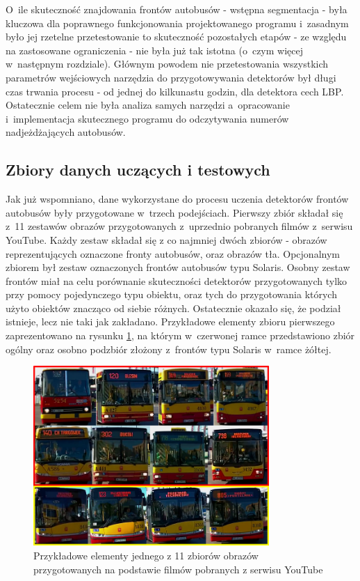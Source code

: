 O~ile skuteczność znajdowania frontów autobusów - wstępna segmentacja - 
była kluczowa dla poprawnego funkcjonowania projektowanego programu 
i~zasadnym było jej rzetelne przetestowanie to skuteczność pozostałych
etapów - ze względu na zastosowane ograniczenia - nie była już tak
istotna (o~czym więcej w~następnym rozdziale). Głównym powodem nie przetestowania wszystkich parametrów
wejściowych narzędzia do przygotowywania detektorów był długi czas 
trwania procesu
- od jednej do kilkunastu godzin, dla detektora cech LBP. Ostatecznie
celem nie była analiza samych narzędzi a~opracowanie i~implementacja
skutecznego programu do odczytywania numerów nadjeżdżających autobusów.

\subsection{Zbiory danych uczących i testowych}

Jak już wspomniano, dane wykorzystane do procesu uczenia detektorów frontów autobusów były przygotowane w~trzech podejściach.
Pierwszy zbiór składał się z~11 zestawów obrazów
przygotowanych z~uprzednio pobranych filmów z~serwisu YouTube.
Każdy zestaw składał się z co najmniej dwóch zbiorów - obrazów 
reprezentujących oznaczone fronty autobusów, oraz obrazów tła. 
Opcjonalnym zbiorem był zestaw oznaczonych 
frontów autobusów typu Solaris. Osobny zestaw frontów miał na celu
porównanie skuteczności detektorów przygotowanych tylko przy pomocy
pojedynczego typu obiektu, oraz tych do przygotowania których użyto
obiektów znacząco od siebie różnych. Ostatecznie okazało się,
że podział istnieje, lecz nie taki jak zakładano. Przykładowe
elementy zbioru pierwszego zaprezentowano na rysunku \ref{fig:jJ9ixBfVR5k_types}, na którym w~czerwonej ramce
przedstawiono zbiór ogólny oraz osobno podzbiór złożony z~frontów typu
Solaris w~ramce żółtej.

\begin{figure}[!h]
	\centering
	\includegraphics[width=0.8\textwidth]{img/exp_trainig_data_jJ9}
	\caption{Przykładowe elementy jednego z 11 zbiorów obrazów
		przygotowanych na podstawie
		filmów pobranych z serwisu YouTube}
	\label{fig:jJ9ixBfVR5k_types}
\end{figure}

